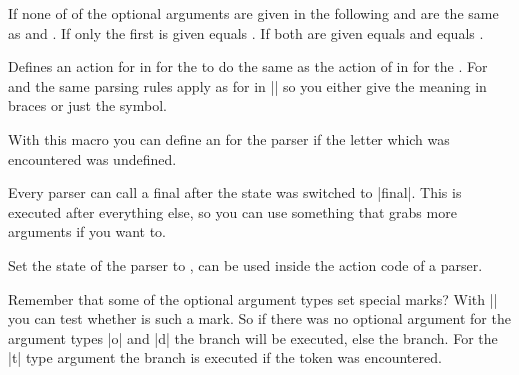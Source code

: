 \begin{command}
  {%
    \pgfparserxlet
  }
  If none of of the optional arguments are given in the following  and  are the same as  and
  . If only the first is given  equals
  . If both are given  equals  and
   equals .

  Defines an action for  in  for the
   to do the same as the action of 
  in  for the . For 
  and  the same parsing rules apply as for  in |\pgfparserxdef| so you either give the meaning in braces or just
  the symbol.
\end{command}

\begin{command}
  {\pgfparserxdefunknown{}}
  With this macro you can define an  for the 
  parser if the letter which was encountered was undefined.
\end{command}

\begin{command}{\pgfparserxdeffinal{}}
  Every parser can call a final  after the state was switched to
  |final|. This  is executed after everything else, so you can use
  something that grabs more arguments if you want to.
\end{command}

\begin{command}{\pgfparserxswitch{}}
  Set the state of the parser to , can be used inside the action
  code of a parser.
\end{command}

\begin{command}{\pgfparserxifmark{}}
  Remember that some of the optional argument types set special marks? With
  |\pgfparserxifmark| you can test whether  is such a mark. So if
  there was no optional argument for the argument types |o| and |d| the
   branch will be executed, else the  branch. For the |t|
  type argument the  branch is executed if the token was encountered.
\end{command}

